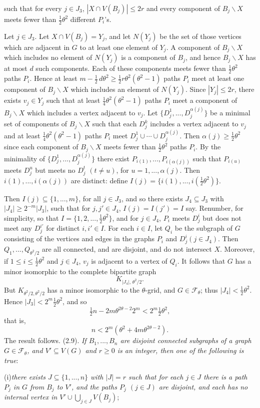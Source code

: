\noindent such that for every $j\in J_3$, $|X\cap V(B_j)|\le 2r$ and every component of $B_j\backslash X$
meets fewer than $\frac12\theta^2$ different $P_i$'s.

Let $j\in J_3$. Let $X\cap V(B_j)=Y_j$, and let $N(Y_j)$ be the set of those vertices
which are adjacent in $G$ to at least one element of $Y_j$. A component of $B_j\backslash X$
which includes no element of $N(Y_j)$ is a component of $B_j$, and hence $B_j\backslash X$
has at most $d$ such components. Each of these components meets fewer than
$\frac12\theta^2$ paths $P_i$. Hence at least $m-\frac12\,d\theta^2\ge\frac12 r\theta^2(\theta^2-1)$ paths $P_i$ meet at least
one component of $B_j\backslash X$ which includes an element of $N(Y_j)$. Since $|Y_j|\le 2r$,
there exists $v_j\in Y_j$ such that at least $\frac14\theta^2(\theta^2-1)$ paths $P_i$ meet a component
of $B_j\backslash X$ which includes a vertex adjacent to $v_j$. Let $\{D_j^1,..., D_j^{\alpha(j)}\}$ be a
minimal set of components of $B_j\backslash X$ such that each $D_j^k$ includes a vertex
adjacent to $v_j$ and at least $\frac14\theta^2(\theta^2-1)$ paths $P_i$ meet $D_j^1\cup\cdots\cup D_j^{\alpha(j)}$. Then
$\alpha(j)\ge\frac12\theta^2$ since each component of $B_j\backslash X$ meets fewer than $\frac12\theta^2$ paths $P_i$. By
the minimality of $\{D_j^1,..., D_j^{\alpha(j)}\}$ there exist $P_{i(1)},..., P_{i(\alpha(j))}$ such that $P_{i(u)}$
meets $D_j^u$ but meets no $D_j^t$ $(t\ne u)$, for $u=1,..., \alpha(j)$. Then $i(1),..., i(\alpha(j))$ are
distinct: define $I(j)=\{i(1),..., i(\frac12\theta^2)\}$.

Then $I(j)\subseteq\{1,..., m\}$, for all $j\in J_3$, and so there exists $J_4\subseteq J_3$ with $|J_4|\ge
2^{-m}|J_3|$, such that for $j, j'\in J_4$, $I(j)=I(j')=I$ say. Renumber, for
simplicity, so that $I=\{1, 2,..., \frac12\theta^2\}$, and for $j\in J_4$, $P_i$ meets $D_j^i$ but does not
meet any $D_j^{i'}$ for distinct $i, i'\in I$. For each $i\in I$, let $Q_i$ be the subgraph of $G$
consisting of the vertices and edges in the graphs $P_i$ and $D_j^i$$(j\in J_4)$. Then
$Q_1,..., Q_{\theta^2/2}$ are all connected, and are disjoint, and do not intersect $X$.
Moreover, if $1\le i\le\frac12\theta^2$ and $j\in J_4$, $v_j$ is adjacent to a vertex of $Q_i$. It
follows that $G$ has a minor isomorphic to the complete bipartite graph
\begin{equation*}
K_{|J_4|,\,\theta^2/2}.
\end{equation*}
But $K_{\theta^2/2,\theta^2/2}$ has a minor isomorphic to the $\theta$-grid, and $G\in\mathscr{F}_\theta$; thus
$|J_4|<\frac12\theta^2$. Hence $|J_3|<2^m\frac12\theta^2$, and so
\begin{equation*}
\tfrac12 n-2m\theta^{2\theta-2}2^m<2^m\tfrac12\theta^2,
\end{equation*}
that is,
\begin{equation*}
n<2^m(\theta^2+4m\theta^{2\theta-2}).
\end{equation*}
The result follows.
\stmt
(2.9). \textit{If $B_1,..., B_n$ are disjoint connected subgraphs of a graph $G\in\mathscr{F}_\theta$,
and $V'\subseteq V(G)$ and $r\ge 0$ is an integer, then one of the following is true}:

\hspace*{12pt}(i)\enspace\textit{there exists $J\subseteq\{1,..., n\}$ with $|J|=r$ such that for each $j\in J$ there
is a path $P_j$ in $G$ from $B_j$ to $V'$, and the paths $P_j$ $(j\in J)$ are disjoint, and
each has no internal vertex in $V'\cup\bigcup_{j\in J}V(B_j)$};
